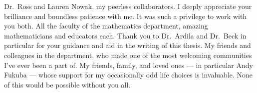 \documentclass{article}
\begin{document}
Dr.~Ross and Lauren Nowak, my peerless collaborators.
I deeply appreciate your brilliance and boundless patience with me.
It was such a privilege to work with you both.
\newline\newline
All the faculty of the mathematics department, amazing mathematicians and educators each.
Thank you to Dr.~Ardila and Dr.~Beck in particular for your guidance and aid in the writing of this thesis.
\newline\newline
My friends and colleagues in the department, who made one of the most welcoming communities I've ever been a part of.
\newline\newline
My friends, family, and loved ones --- in particular Andy Fukuba --- whose support for my occasionally odd life choices is invaluable.
None of this would be possible without you all.
\end{document}

